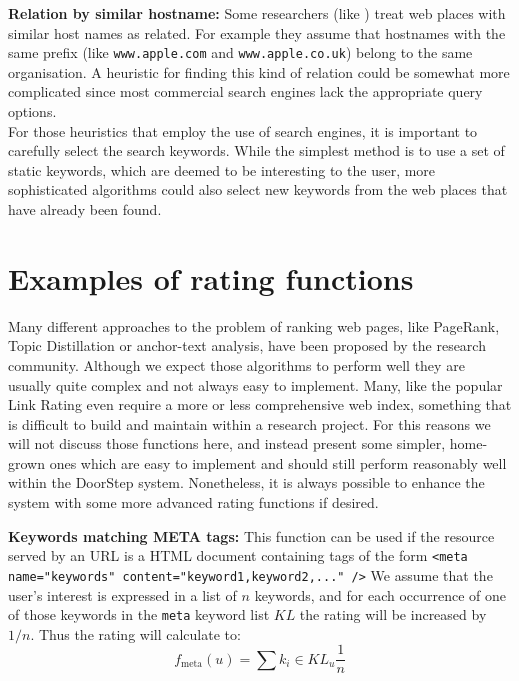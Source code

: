 \documentclass[a4paper]{danarticle}
\theoremstyle{remark}
\begin{document}
    \textbf{Relation by similar hostname:} Some researchers (like 
    \cite[Link Affiliation]{experts}) 
    treat web places with similar host names as related. For example they 
    assume that hostnames with the same prefix (like \verb$www.apple.com$ and
    \verb$www.apple.co.uk$) belong to the same organisation. A heuristic for 
    finding this kind of relation could be somewhat more complicated since most 
    commercial search engines lack the appropriate query options.
    \\
    
    For those heuristics that employ the use of search engines, it is important 
    to carefully select the search keywords. While the simplest method is to use 
    a set of static keywords, which are deemed to be interesting to the user, 
    more sophisticated algorithms could also select new keywords from the web 
    places that have already been found.
  \section{Examples of rating functions}
    \label{rateexample}
    Many different approaches to the problem of ranking web pages, 
    like PageRank\cite{page}, Topic Distillation\cite{kleinberg} or
    anchor-text analysis\cite{chakrabarti}, have been proposed by the research
    community. Although we expect those algorithms to perform well they are
    usually quite complex and not always easy to implement.
    Many, like the popular Link Rating\cite{page}\cite{kleinberg}
    even require a more or less comprehensive web index, something that is difficult 
    to build and maintain within a research project. For this reasons we will not 
    discuss those functions here, and instead present some simpler, home-grown 
    ones which are easy to implement and should still perform reasonably well 
    within the DoorStep system. Nonetheless, it is always possible to enhance 
    the system with some more advanced rating functions if desired.
  
    \textbf{Keywords matching META tags:} This function can be used if the
    resource served by an URL is a HTML document containing tags of the form
    \verb$<meta name="keywords" content="keyword1,keyword2,..." />$ 
    We assume that the user's interest is expressed in a list of $ n $ keywords,
    and for each occurrence of one of those keywords in the \verb$meta$
    keyword list $ KL $ the rating will be increased by $ 1/n $. Thus
    the rating will calculate to:
    \[
      f_{\mbox{meta}}(u) = \sum{k_i \in KL_u} \frac{1}{n}
    \]
    \\
    
\end{document}
